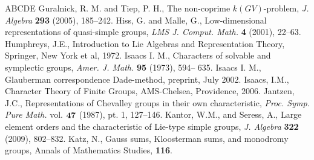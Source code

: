 \documentclass[11pt]{amsart}
\theoremstyle{plain}
\theoremstyle{definition}
\numberwithin{thm}{section}
\numberwithin{equation}{thm}
\newcommand{\0}{\emptyset}
\begin{document}
\begin{thebibliography}{ABCDE}
\medskip
{} Guralnick, R. M. and Tiep, P. H., The non-coprime $k(GV)$-problem, {\it J. Algebra} {\bf 293} (2005), 185--242. 
\medskip
{}Hiss, G. and Malle, G., Low-dimensional representations of quasi-simple groups, {\it LMS J. Comput. Math.} {\bf 4} (2001), 22--63.
\medskip
{}
  Humphreys, J.E., Introduction to Lie Algebras and Representation 
Theory, Springer, New York et al, 1972.
\medskip
{}
  Isaacs I. M., Characters of solvable and symplectic groups, {\it Amer. J. Math.} {\bf 95} (1973), 594-- 635.
\medskip
{}
  Isaacs I. M., Glauberman correspondence Dade-method,   preprint, July 2002.  
\medskip
{}
 Isaacs, I.M., Character Theory of Finite Groups, AMS-Chelsea, Providence, 2006.
\medskip
{}
  Jantzen, J.C., Representations of Chevalley groups in their own
characteristic, {\it Proc. Symp. Pure Math.} vol. $\bf 47$ (1987), pt. 1,
127--146.
\medskip
{}
  Kantor, W.M.,  and Seress, A.,  Large element orders and the characteristic of Lie-type simple groups, {\it J. Algebra} {\bf 322} (2009), 
802--832.
\medskip
{}Katz, N., Gauss sums, Kloosterman sums, and monodromy groups, Annals of Mathematics Studies, {\bf 116}. 

\end{thebibliography}
\end{document}

